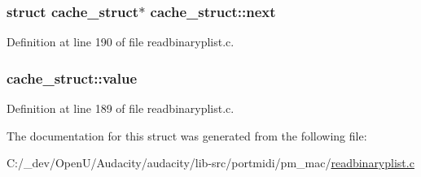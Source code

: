 \subsubsection[{\texorpdfstring{next}{next}}]{\setlength{\rightskip}{0pt plus 5cm}struct {\bf cache\+\_\+struct}$\ast$ cache\+\_\+struct\+::next}\hypertarget{structcache__struct_a83ba7f55c16385762f41cb542f461dda}{}\label{structcache__struct_a83ba7f55c16385762f41cb542f461dda}


Definition at line 190 of file readbinaryplist.\+c.

\subsubsection[{\texorpdfstring{value}{value}}]{ cache\+\_\+struct\+::value}\hypertarget{structcache__struct_aafd2fa83cd12c368a8c1ecfe71c7eb2c}{}\label{structcache__struct_aafd2fa83cd12c368a8c1ecfe71c7eb2c}


Definition at line 189 of file readbinaryplist.\+c.



The documentation for this struct was generated from the following file\+:\begin{DoxyCompactItemize}
\item 
C\+:/\+\_\+dev/\+Open\+U/\+Audacity/audacity/lib-\/src/portmidi/pm\+\_\+mac/\hyperlink{readbinaryplist_8c}{readbinaryplist.\+c}\end{DoxyCompactItemize}
